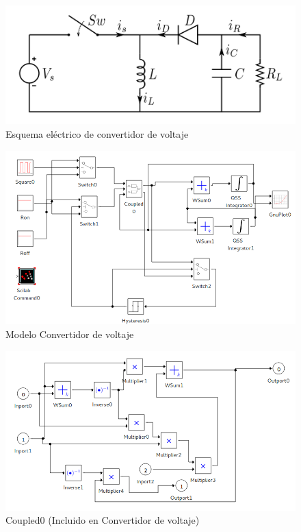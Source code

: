 \documentclass{beamer}
\begin{document}
\begin{frame}
\begin{figure}[H]
\centering
 \includegraphics[width=.60\linewidth]{Buckboost_conventions}
 \caption{Esquema eléctrico de convertidor de voltaje}\label{buckdisk-squema}
\end{figure}
\end{frame}

\begin{frame}
\begin{figure}[H]
\includegraphics[width=0.75\linewidth]{buck_disk}
\caption{Modelo Convertidor de voltaje}\label{model:buckdisk}
\end{figure}
\begin{figure}[H]
\includegraphics[width=0.75\linewidth]{buck_disk_coupled0}
\caption{Coupled0 (Incluido en Convertidor de voltaje)}\label{model:buckdiskcoupled0}
\end{figure}
\end{frame}
\end{document}
